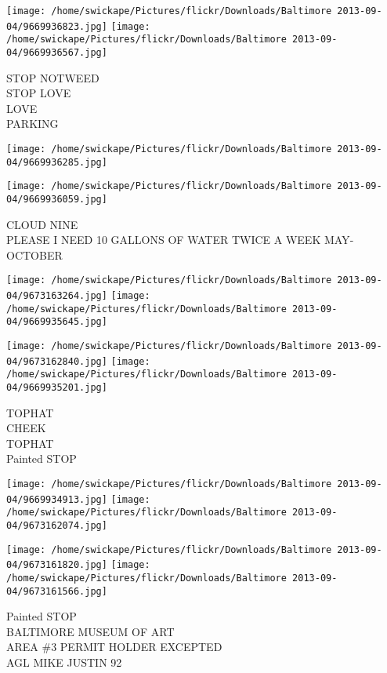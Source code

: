 \documentclass[10pt,letterpaper]{article}
\begin{document}
\texttt{[image: /home/swickape/Pictures/flickr/Downloads/Baltimore 2013-09-04/9669936823.jpg]}
\texttt{[image: /home/swickape/Pictures/flickr/Downloads/Baltimore 2013-09-04/9669936567.jpg]}

STOP NOTWEED\\
STOP LOVE\\
LOVE\\
PARKING\\
\pagebreak

\texttt{[image: /home/swickape/Pictures/flickr/Downloads/Baltimore 2013-09-04/9669936285.jpg]}

\vspace{0.25in}
\texttt{[image: /home/swickape/Pictures/flickr/Downloads/Baltimore 2013-09-04/9669936059.jpg]}

CLOUD NINE\\
PLEASE I NEED 10 GALLONS OF WATER TWICE A WEEK MAY{-}OCTOBER\\
\pagebreak

\texttt{[image: /home/swickape/Pictures/flickr/Downloads/Baltimore 2013-09-04/9673163264.jpg]}
\texttt{[image: /home/swickape/Pictures/flickr/Downloads/Baltimore 2013-09-04/9669935645.jpg]}

\texttt{[image: /home/swickape/Pictures/flickr/Downloads/Baltimore 2013-09-04/9673162840.jpg]}
\texttt{[image: /home/swickape/Pictures/flickr/Downloads/Baltimore 2013-09-04/9669935201.jpg]}

TOPHAT\\
CHEEK\\
TOPHAT\\
Painted STOP\\
\pagebreak

\texttt{[image: /home/swickape/Pictures/flickr/Downloads/Baltimore 2013-09-04/9669934913.jpg]}
\texttt{[image: /home/swickape/Pictures/flickr/Downloads/Baltimore 2013-09-04/9673162074.jpg]}

\texttt{[image: /home/swickape/Pictures/flickr/Downloads/Baltimore 2013-09-04/9673161820.jpg]}
\texttt{[image: /home/swickape/Pictures/flickr/Downloads/Baltimore 2013-09-04/9673161566.jpg]}

Painted STOP\\
BALTIMORE MUSEUM OF ART\\
AREA \#3 PERMIT HOLDER EXCEPTED\\
AGL MIKE JUSTIN 92\\
\pagebreak
\end{document}
